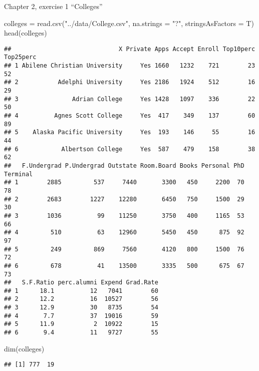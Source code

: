 \documentclass[
]{article}
\author{}
\date{\vspace{-2.5em}}
\newenvironment{Shaded}{\begin{snugshade}}{\end{snugshade}}
\newcommand{\AttributeTok}[1]{\textcolor[rgb]{0.77,0.63,0.00}{#1}}
\newcommand{\FunctionTok}[1]{\textcolor[rgb]{0.00,0.00,0.00}{#1}}
\newcommand{\NormalTok}[1]{#1}
\newcommand{\OtherTok}[1]{\textcolor[rgb]{0.56,0.35,0.01}{#1}}
\newcommand{\StringTok}[1]{\textcolor[rgb]{0.31,0.60,0.02}{#1}}
\begin{document}
Chapter 2, exercise 1 ``Colleges''

\begin{Shaded}
\begin{Highlighting}[]
\NormalTok{colleges }\OtherTok{=} \FunctionTok{read.csv}\NormalTok{(}\StringTok{"../data/College.csv"}\NormalTok{, }\AttributeTok{na.strings =} \StringTok{"?"}\NormalTok{,}
\AttributeTok{stringsAsFactors =}\NormalTok{ T)}
\FunctionTok{head}\NormalTok{(colleges)}
\end{Highlighting}
\end{Shaded}

\begin{verbatim}
##                              X Private Apps Accept Enroll Top10perc Top25perc
## 1 Abilene Christian University     Yes 1660   1232    721        23        52
## 2           Adelphi University     Yes 2186   1924    512        16        29
## 3               Adrian College     Yes 1428   1097    336        22        50
## 4          Agnes Scott College     Yes  417    349    137        60        89
## 5    Alaska Pacific University     Yes  193    146     55        16        44
## 6            Albertson College     Yes  587    479    158        38        62
##   F.Undergrad P.Undergrad Outstate Room.Board Books Personal PhD Terminal
## 1        2885         537     7440       3300   450     2200  70       78
## 2        2683        1227    12280       6450   750     1500  29       30
## 3        1036          99    11250       3750   400     1165  53       66
## 4         510          63    12960       5450   450      875  92       97
## 5         249         869     7560       4120   800     1500  76       72
## 6         678          41    13500       3335   500      675  67       73
##   S.F.Ratio perc.alumni Expend Grad.Rate
## 1      18.1          12   7041        60
## 2      12.2          16  10527        56
## 3      12.9          30   8735        54
## 4       7.7          37  19016        59
## 5      11.9           2  10922        15
## 6       9.4          11   9727        55
\end{verbatim}

\begin{Shaded}
\begin{Highlighting}[]
\FunctionTok{dim}\NormalTok{(colleges)}
\end{Highlighting}
\end{Shaded}

\begin{verbatim}
## [1] 777  19
\end{verbatim}
\end{document}
